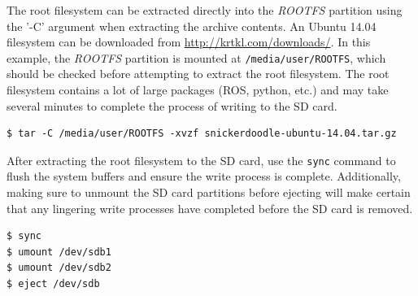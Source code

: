 The root filesystem can be extracted directly into the \textit{ROOTFS} partition using the '-C' argument when extracting the archive contents. An Ubuntu 14.04 filesystem can be downloaded from \url{http://krtkl.com/downloads/}. In this example, the \textit{ROOTFS} partition is mounted at \texttt{/media/user/ROOTFS}, which should be checked before attempting to extract the root filesystem. The root filesystem contains a lot of large packages (ROS, python, etc.) and may take several minutes to complete the process of writing to the SD card.


\begin{fullwidth}
\begin{lstlisting}
$ tar -C /media/user/ROOTFS -xvzf snickerdoodle-ubuntu-14.04.tar.gz
\end{lstlisting}
\end{fullwidth}


After extracting the root filesystem to the SD card, use the \texttt{sync} command to flush the system buffers and ensure the write process is complete. Additionally, making sure to unmount the SD card partitions before ejecting will make certain that any lingering write processes have completed before the SD card is removed.


\begin{lstlisting}
$ sync
$ umount /dev/sdb1
$ umount /dev/sdb2
$ eject /dev/sdb
\end{lstlisting}





